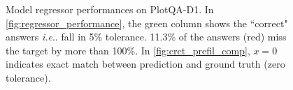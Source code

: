 \documentclass[runningheads]{llncs}
\makeatletter
\DeclareRobustCommand\onedot{\futurelet\@let@token\@onedot}
\def\@onedot{\ifx\@let@token.\else.\null\fi\xspace}
\def\ie{\emph{i.e}\onedot} \def\Ie{\emph{I.e}\onedot}
\makeatother
\begin{document}
\begin{figure}[ht]\centering
    \hfill
    \caption{Model regressor performances on PlotQA-D1. In \ref{fig:regressor_performance}, the green column shows the ``correct" answers \ie fall in 5\% tolerance. 11.3\% of the answers (red) miss the target by more than 100\%. In \ref{fig:crct_prefil_comp}, $x=0$ indicates exact match between prediction and ground truth (zero tolerance).}
\end{figure}
\end{document}

